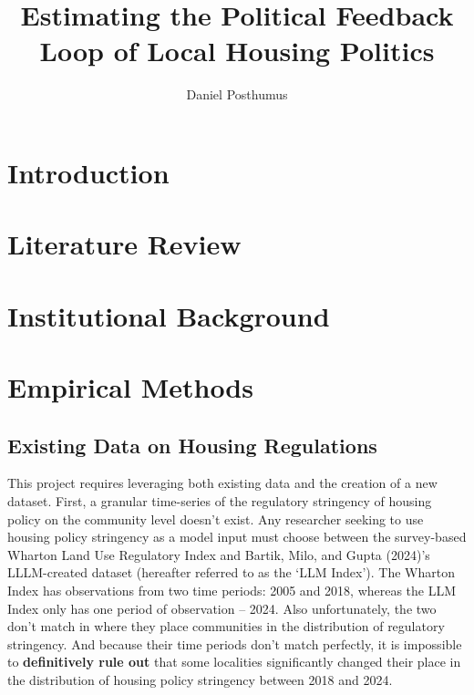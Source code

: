 \documentclass{article}
\title{Estimating the Political Feedback Loop of Local Housing Politics}
\author{Daniel Posthumus}
\begin{document}
\maketitle

\tableofcontents

\section{Introduction}



\section{Literature Review}


\section{Institutional Background}


\section{Empirical Methods}

\subsection{Existing Data on Housing Regulations}
This project requires leveraging both existing data and the creation of a new dataset. First, a granular time-series of the regulatory stringency of housing policy on the community level doesn't exist. Any researcher seeking to use housing policy stringency as a model input must choose between the survey-based Wharton Land Use Regulatory Index and Bartik, Milo, and Gupta (2024)'s LLLM-created dataset (hereafter referred to as the `LLM Index'). The Wharton Index has observations from two time periods: 2005 and 2018, whereas the LLM Index only has one period of observation -- 2024. Also unfortunately, the two don't match in where they place communities in the distribution of regulatory stringency. And because their time periods don't match perfectly, it is impossible to \textbf{definitively rule out} that some localities significantly changed their place in the distribution of housing policy stringency between 2018 and 2024. 
\end{document}
